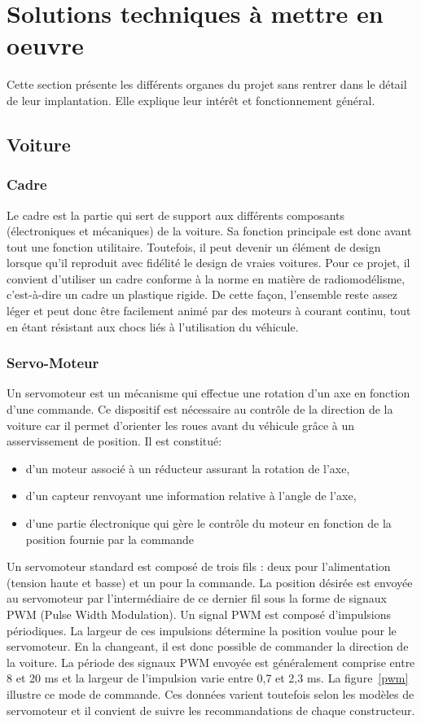 \documentclass[a4paper,12pt]{report}
\begin{document}
	\section{Solutions techniques à mettre en oeuvre}
	Cette section présente les différents organes du projet sans rentrer dans le détail de leur implantation. Elle explique leur intérêt et fonctionnement général.
	
		\subsection{Voiture}
		
			\subsubsection{Cadre}
			Le cadre est la partie qui sert de support aux différents composants (électroniques et mécaniques) de la voiture. Sa fonction principale est donc avant tout une fonction utilitaire. Toutefois, il peut devenir un élément de design lorsque qu’il reproduit avec fidélité le design de vraies voitures.
Pour ce projet, il convient d’utiliser un cadre conforme à la norme en matière de radiomodélisme, c’est-à-dire un cadre un plastique rigide. De cette façon, l’ensemble reste assez léger et peut donc être facilement animé par des moteurs à courant continu, tout en étant résistant aux chocs liés à l’utilisation du véhicule.
			
			\subsubsection{Servo-Moteur}
			Un servomoteur est un mécanisme qui effectue une rotation d’un axe en fonction d’une commande. Ce dispositif est nécessaire au contrôle de la direction de la voiture car il permet d’orienter les roues avant du véhicule grâce à un asservissement de position. Il est constitué:
\begin{itemize}
\item d’un moteur associé à un réducteur assurant la rotation de l’axe,
\item d’un capteur renvoyant une information relative à l’angle de l’axe,
\item d’une partie électronique qui gère le contrôle du moteur en fonction de la position fournie par la commande
\end{itemize}

Un servomoteur standard est composé de trois fils : deux pour l’alimentation (tension haute et basse) et un pour la commande. La position désirée est envoyée au servomoteur par l’intermédiaire de ce dernier fil sous la forme de signaux PWM (Pulse Width Modulation).
Un signal PWM est composé d’impulsions périodiques. La largeur de ces impulsions détermine la position voulue pour le servomoteur. En la changeant, il est donc possible de commander la direction de la voiture. La période des signaux PWM envoyée est généralement comprise entre 8 et 20 ms et la largeur de l’impulsion varie entre 0,7 et 2,3 ms. La figure~\ref{pwm} illustre ce mode de commande. Ces données varient toutefois selon les modèles de servomoteur et il convient de suivre les recommandations de chaque constructeur.
\end{document}
